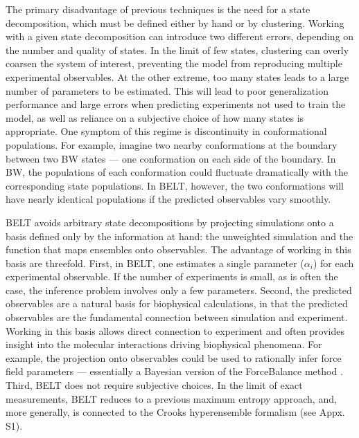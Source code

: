 \documentclass[journal=jacsat,manuscript=article]{achemso}
\begin{document}
The primary disadvantage of previous techniques is the need for a state decomposition, which must be defined either by hand or by clustering.  Working with a given state decomposition can introduce two different errors, depending on the number  and quality of states.  In the limit of few states, clustering can overly coarsen the system of interest, preventing the model from reproducing multiple experimental observables.  At the other extreme, too many states leads to a large number of parameters to be estimated. This will lead to poor generalization performance and large errors when predicting experiments not used to train the model, as well as reliance on a subjective choice of how many states is appropriate.  One symptom of this regime is discontinuity in conformational populations. For example, imagine two nearby conformations at the boundary between two BW states --- one conformation on each side of the boundary.  In BW, the populations of each conformation could fluctuate dramatically with the 
corresponding state populations.  In BELT, however, the two conformations will have nearly identical populations if the predicted observables vary smoothly.

BELT avoids arbitrary state decompositions by projecting simulations onto a basis defined only by the information at hand: the unweighted simulation and the function that maps ensembles onto observables.  The advantage of working in this basis are threefold. First, in BELT, one estimates a single parameter ($\alpha_i$) for each experimental observable.  If the number of experiments is small, as is often the case, the inference problem involves only a few parameters.  Second, the predicted observables are a natural basis for biophysical calculations, in that the predicted observables are the fundamental connection between simulation and experiment.  Working in this basis allows direct connection to experiment and often provides insight into the molecular interactions driving biophysical phenomena.  For example, the projection onto observables could be used to rationally infer force field parameters --- essentially a Bayesian version of the ForceBalance method  \cite{wang2012, wang2013systematic}.  Third, BELT 
does not require subjective choices.  In the limit of exact measurements, BELT reduces to a previous  \cite{chodera2012} maximum entropy approach, and, more generally, is connected to the Crooks hyperensemble formalism (see Appx. S1).  
\end{document}
